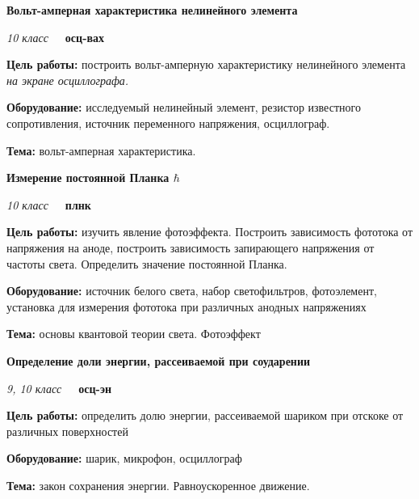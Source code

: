 \documentclass[a4paper,10pt]{article}
\newcommand{\labtitle}[7]{
	\textbf{#2}\par
	\textit{#1 класс}~~~\textbf{#3}\par
	\textbf{Цель работы:} #4\par
	\textbf{Оборудование:} #5\par
	\textbf{Тема:} #6
}
\begin{document}
\begin{enumerate}
		{\item}
	\item \labtitle
		{10}
		{Вольт-амперная характеристика нелинейного элемента}
		{осц-вах}
		{построить вольт-амперную характеристику нелинейного элемента \textit{на экране осциллографа.}}
		{исследуемый нелинейный элемент, резистор известного сопротивления, источник переменного напряжения, осциллограф.}
		{вольт-амперная характеристика. }
		{\item}
	\item \labtitle
		{10}
		{Измерение постоянной Планка $\hbar$}
		{плнк}
		{изучить явление фотоэффекта. Построить зависимость фототока от напряжения на аноде, построить зависимость запирающего напряжения от частоты света. Определить значение постоянной Планка.}
		{источник белого света, набор светофильтров, фотоэлемент, установка для измерения фототока при различных анодных напряжениях}
		{основы квантовой теории света. Фотоэффект}
		{\item}
	\item \labtitle
		{9, 10}
		{Определение доли энергии, рассеиваемой при соударении}
		{осц-эн}
		{определить долю энергии, рассеиваемой шариком при отскоке от различных поверхностей}
		{шарик, микрофон, осциллограф}
		{закон сохранения энергии. Равноускоренное движение.}
		{\item Мы роняем шарик на стол. Он отскакивает от стола, теряя часть энергии. Если он в воздухе находится время $\Delta t$, значит его скорость в нижней точке $V=\frac{gt}{2}$, а энергия "--- $E=\frac{mg^2\Delta t^2}{8} \propto \Delta t^2$
		\item При помощи осциллографа определяем моменты, в которые шарик соприкасался со столом. Определяем времена нахождения шарика в воздухе и вычисляем долю энергии, которую он теряет при соударении со столом.
}
\end{enumerate}
\end{document}

